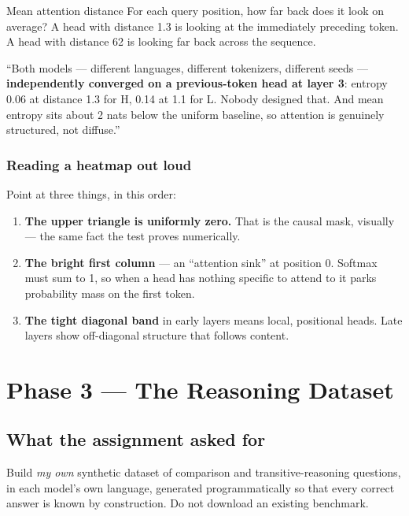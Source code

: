 \documentclass[11pt]{report}
\begin{document}
\begin{concept}{Mean attention distance}
For each query position, how far back does it look on average? A head with
distance 1.3 is looking at the immediately preceding token. A head with distance
62 is looking far back across the sequence.
\end{concept}

\begin{saybox}
``Both models --- different languages, different tokenizers, different seeds ---
\textbf{independently converged on a previous-token head at layer 3}: entropy
0.06 at distance 1.3 for H, 0.14 at 1.1 for L. Nobody designed that. And mean
entropy sits about 2 nats below the uniform baseline, so attention is genuinely
structured, not diffuse.''
\end{saybox}

\subsection{Reading a heatmap out loud}

Point at three things, in this order:

\begin{enumerate}[leftmargin=*]
\item \textbf{The upper triangle is uniformly zero.} That is the causal mask,
      visually --- the same fact the test proves numerically.
\item \textbf{The bright first column} --- an ``attention sink'' at position 0.
      Softmax must sum to 1, so when a head has nothing specific to attend to it
      parks probability mass on the first token.
\item \textbf{The tight diagonal band} in early layers means local, positional
      heads. Late layers show off-diagonal structure that follows content.
\end{enumerate}

\chapter{Phase 3 --- The Reasoning Dataset}

\section{What the assignment asked for}

Build \emph{my own} synthetic dataset of comparison and transitive-reasoning
questions, in each model's own language, generated programmatically so that
every correct answer is known by construction. Do not download an existing
benchmark.
\end{document}

